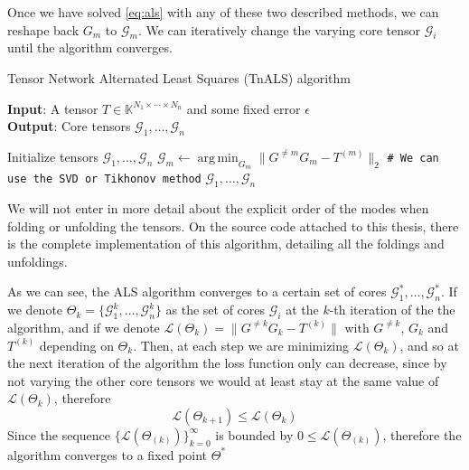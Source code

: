 \documentclass[11pt,a4paper,openright,oneside]{book}
\numberwithin{equation}{section}
\DeclareMathOperator*{\argmin}{arg\,min}
\begin{document}
{Once we have solved \eqref{eq:als} with any of these two described methods, we can reshape back $G_m$ to $\mathcal{G}_m$.
We can iteratively change the varying core tensor $\mathcal{G}_i$ until the algorithm converges.

\begin{algorithm}[H]
    \caption{Tensor Network Alternated Least Squares (\gls{TnALS}) algorithm}

    \hspace*{\algorithmicindent} \textbf{Input}: A tensor $T \in \mathbb{K}^{N_1 \times \cdots \times N_n}$ and some fixed error $\epsilon$ \\
    \hspace*{\algorithmicindent} \textbf{Output}: Core tensors $\mathcal{G}_1, \dots, \mathcal{G}_n$ 

    \begin{algorithmic}[1]
        \State Initialize tensors $\mathcal{G}_1, \dots, \mathcal{G}_n$
            \State $\mathcal{G}_m \leftarrow \argmin_{G_m} \|G^{\neq m} G_m - T^{(m)}\|_2$ \qquad \verb|# We can use the SVD or Tikhonov method|
            \EndFor
        \EndWhile
        \State \Return $\mathcal{G}_1, \dots, \mathcal{G}_n$

    \end{algorithmic}

\end{algorithm}

We will not enter in more detail about the explicit order of the modes when folding or unfolding the tensors. On the source code
attached to this thesis, there is the complete implementation of this algorithm, detailing all the foldings and unfoldings.

As we can see, the ALS algorithm converges to a certain set of cores $\mathcal{G}_1^*, \dots, \mathcal{G}_n^*$. If we denote
$\Theta_k = \{\mathcal{G}_1^k, \dots, \mathcal{G}_n^k\}$ as the set of cores $\mathcal{G}_i$ at the $k$-th iteration of the the algorithm,
and if we denote $\mathcal{L}(\Theta_k) = \|G^{\neq k} G_k - T^{(k)}\|$ with $G^{\neq k}$, $G_k$ and $T^{(k)}$ depending on $\Theta_k$. 
Then, at each step we are minimizing $\mathcal{L}(\Theta_k)$, and so at the next iteration of the algorithm the loss function
only can decrease, since by not varying the other core tensors we would at least stay at the same value of $\mathcal{L}(\Theta_k)$, therefore
$$\mathcal{L}(\Theta_{k+1}) \leqslant \mathcal{L}(\Theta_k)$$
Since the sequence $\{\mathcal{L}(\Theta_{(k)})\}_{k=0}^\infty$ is bounded by $0 \leqslant \mathcal{L}(\Theta_{(k)})$, therefore
the algorithm converges to a fixed point $\Theta^*$

}
\end{document}
